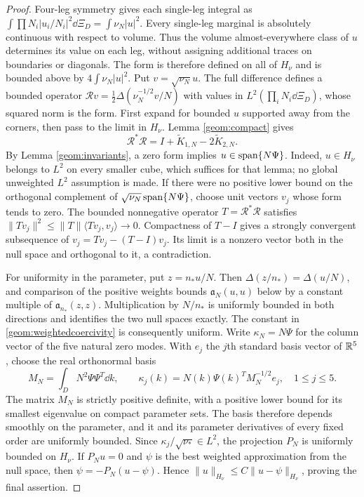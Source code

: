 \begin{proof}
Four-leg symmetry gives each single-leg integral as
$\int\prod N_i |u_i/N_i|^2\dd\Xi_D=\int\nu_N|u|^2$.
Every single-leg marginal is absolutely continuous with respect to volume.
Thus the volume almost-everywhere class of $u$ determines its value on
each leg, without assigning additional traces on boundaries or diagonals.
The form is therefore defined on all of $H_\nu$ and is bounded above by
$4\int\nu_N|u|^2$. Put $v=\sqrt{\nu_N}u$.
The full difference defines a bounded operator
$\mathcal Rv=\frac12\Delta(\nu_N^{-1/2}v/N)$ with values in
$L^2(\prod_iN_i\dd\Xi_D)$, whose squared norm is the form.
First expand for bounded $u$ supported away from the corners, then pass
to the limit in $H_\nu$. Lemma \ref{geom:compact} gives
\[
 \mathcal R^*\mathcal R=I+\widetilde K_{1,N}-2\widetilde K_{2,N}.
\]
By Lemma \ref{geom:invariants}, a zero form implies
$u\in\operatorname{span}\{N\Psi\}$. Indeed, $u\in H_\nu$ belongs to $L^2$ on
every smaller cube, which suffices for that lemma; no global unweighted
$L^2$ assumption is made.
If there were no positive lower bound on the orthogonal complement of
$\sqrt{\nu_N}\operatorname{span}\{N\Psi\}$, choose unit vectors $v_j$ whose form tends
to zero. The bounded nonnegative operator $T=\mathcal R^*\mathcal R$
satisfies $\|Tv_j\|^2\le\|T\|\langle Tv_j,v_j\rangle\to0$.
Compactness of $T-I$ gives a strongly convergent subsequence of
$v_j=Tv_j-(T-I)v_j$. Its limit is a nonzero vector both in the null space
and orthogonal to it, a contradiction.

For uniformity in the parameter, put $z=n_*u/N$. Then
$\Delta(z/n_*)=\Delta(u/N)$, and comparison of the positive weights
bounds $\mathfrak a_N(u,u)$ below by a constant multiple of
$\mathfrak a_{n_*}(z,z)$. Multiplication by $N/n_*$ is uniformly bounded
in both directions and identifies the two null spaces exactly.
The constant in \eqref{geom:weightedcoercivity} is consequently uniform.
Write $\kappa_N=N\Psi$ for the column vector of the five natural zero modes.
With $e_j$ the $j$th standard basis vector of $\mathbb R^5$, choose the real
orthonormal basis
\[
 M_N=\int_D N^2\Psi\Psi^T\dd k,\qquad
 \kappa_j(k)=N(k)\Psi(k)^TM_N^{-1/2}e_j,\quad 1\le j\le5.
\]
The matrix $M_N$ is strictly positive definite, with a positive lower
bound for its smallest eigenvalue on compact parameter sets.
The basis therefore depends smoothly on the parameter, and it and its
parameter derivatives of every fixed order are uniformly bounded.
Since $\kappa_j/\sqrt{\nu_*}\in L^2$, the projection $P_N$ is uniformly
bounded on $H_\nu$. If $P_Nu=0$ and $\psi$ is the best weighted
approximation from the null space, then $\psi=-P_N(u-\psi)$.
Hence $\|u\|_{H_\nu}\le C\|u-\psi\|_{H_\nu}$, proving the final assertion.
\end{proof}

